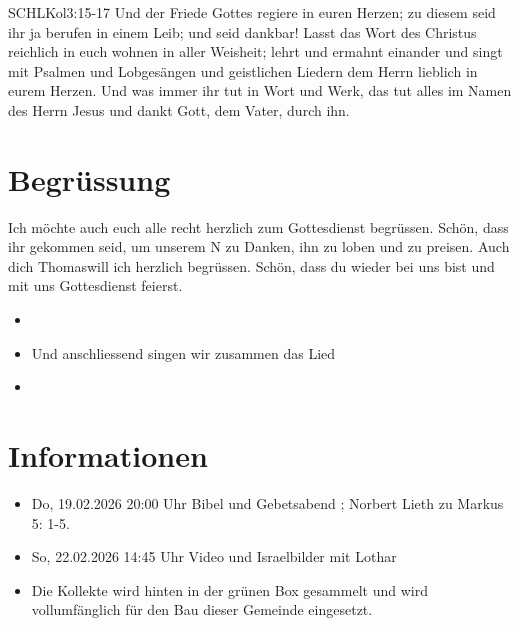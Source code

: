 \documentclass[fontsize=14pt]{../../inc/mybib}
\newcommand{\Name}{Thomas}
\begin{document}
\begin{bibelbox}{SCHL}{Kol}{3:15-17}
Und der Friede Gottes regiere in euren Herzen; zu diesem seid ihr ja berufen in einem Leib; und seid dankbar! Lasst das Wort des Christus reichlich in euch wohnen in aller Weisheit; lehrt und ermahnt einander und singt mit Psalmen und Lobgesängen und geistlichen Liedern dem Herrn lieblich in eurem Herzen. Und was immer ihr tut in Wort und Werk, das tut alles im Namen des Herrn Jesus und dankt Gott, dem Vater, durch ihn.
\end{bibelbox}
\section{Begrüssung}
Ich möchte auch euch alle recht herzlich zum Gottesdienst begrüssen. Schön, dass ihr gekommen seid, um unserem \herr N zu Danken, ihn zu loben und zu preisen.
Auch dich \Name will ich herzlich begrüssen. Schön, dass du wieder bei uns bist und mit uns Gottesdienst feierst.
\begin{itemize}
    \item[] \beten{} 
    \item[] Und anschliessend singen wir zusammen das Lied
    \item[] 
\end{itemize}

\section{Informationen}
\begin{itemize}
    \item {} Do, 19.02.2026 20:00 Uhr Bibel und Gebetsabend ; Norbert Lieth zu Markus 5: 1-5.
    \item {} So, 22.02.2026 14:45 Uhr Video und Israelbilder mit Lothar
    \item {} Die Kollekte wird hinten in der grünen Box gesammelt und wird vollumfänglich für den Bau dieser Gemeinde eingesetzt.
\end{itemize}
\end{document}
